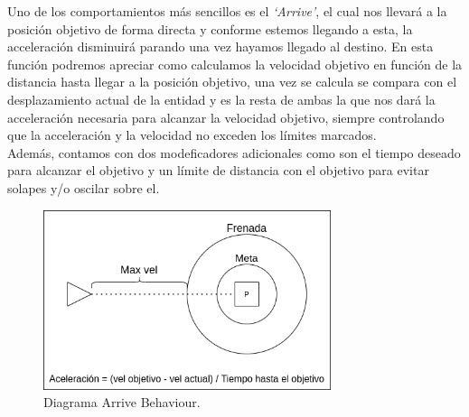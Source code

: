 Uno de los comportamientos más sencillos es el \textit{`Arrive'}, el cual nos
llevará a la posición objetivo de forma directa y conforme estemos llegando a esta, la 
acceleración disminuirá parando una vez hayamos llegado al destino. En esta función podremos
apreciar como calculamos la velocidad objetivo en función de la distancia hasta llegar a
la posición objetivo, una vez se calcula se compara con el desplazamiento actual de la entidad
y es la resta de ambas la que nos dará la acceleración necesaria para alcanzar la velocidad
objetivo, siempre controlando que la acceleración y la velocidad no exceden los límites 
marcados.\\
Además, contamos con dos modeficadores adicionales como son el tiempo deseado para alcanzar el
objetivo y un límite de distancia con el objetivo para evitar solapes y/o oscilar sobre el.



%	
%
%


\begin{figure}[htb]
\centering
\includegraphics[width=0.75\textwidth]{imagenes/diario_desarrollo/arrive_b.png}
\caption{Diagrama Arrive Behaviour.}
\label{fig:arrive_b}
\end{figure} 

